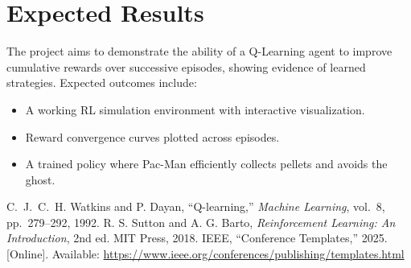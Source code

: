 \documentclass[conference]{IEEEtran}
\begin{document}
\section{Expected Results}
The project aims to demonstrate the ability of a Q-Learning agent to improve cumulative rewards over successive episodes, showing evidence of learned strategies.  
Expected outcomes include:
\begin{itemize}
    \item A working RL simulation environment with interactive visualization.  
    \item Reward convergence curves plotted across episodes.  
    \item A trained policy where Pac-Man efficiently collects pellets and avoids the ghost.  
\end{itemize}

\begin{thebibliography}{00}
C.~J.~C.~H. Watkins and P. Dayan, ``Q-learning,'' \emph{Machine Learning}, vol.~8, pp.~279–292, 1992.
R. S. Sutton and A. G. Barto, \emph{Reinforcement Learning: An Introduction}, 2nd ed. MIT Press, 2018.
IEEE, ``Conference Templates,'' 2025. [Online]. Available: \url{https://www.ieee.org/conferences/publishing/templates.html}
\end{thebibliography}
\end{document}
